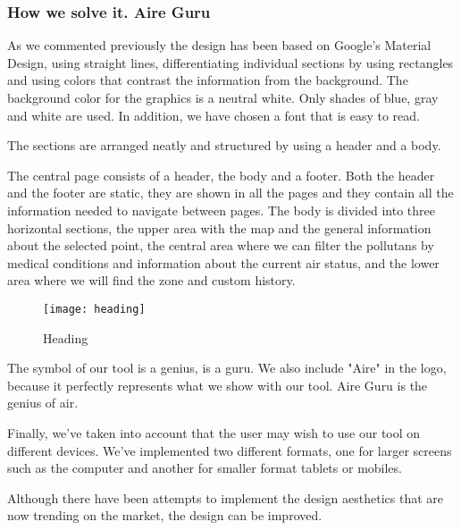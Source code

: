 \subsubsection{How we solve it. Aire Guru} 
As we commented previously the design has been based on Google's Material Design, using straight lines, differentiating individual sections by using rectangles and using colors that contrast the information from the background.
The background color for the graphics is a neutral white. Only shades of blue, gray and white are used. In addition, we have chosen a font that is easy to read.

The sections are arranged neatly and structured by using a header and a body.

The central page consists of a header, the body and a footer. Both the header and the footer are static,
they are shown in all the pages and they contain all the information needed to navigate between pages.
The body is divided into three horizontal sections, the upper area with the map and the general information about the selected point,
the central area where we can filter the pollutans by medical conditions and information about the current air status, and the
lower area where we will find the zone and custom history.

\begin{figure}[ht]
    \centering
    \texttt{[image: heading]}
    \caption{Heading}
\end{figure}
 
    The symbol of our tool is a genius, is a guru. We also include "Aire" in the logo, because it perfectly represents 
    what we show with our tool. Aire Guru is the genius of air.
    
    Finally, we've taken into account that the user may wish to use our tool on different devices. We've implemented
    two different formats, one for larger screens such as the computer and another for smaller format tablets or mobiles.
\begin{itemize}
    \done
    \crossed Although there have been attempts to implement the design aesthetics that are now trending on the market, the design can be improved.
    
\end{itemize}
\newpage